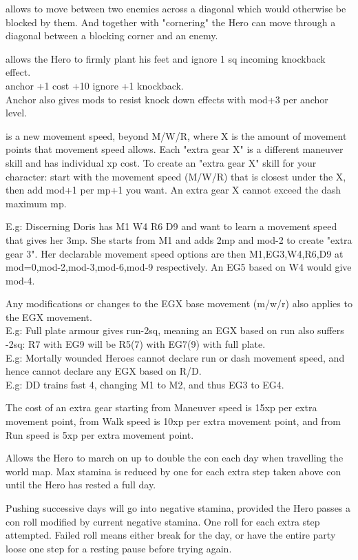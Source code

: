  allows to move between two enemies across a diagonal which would otherwise be blocked by them. And together with "cornering" the Hero can move through a diagonal between a blocking corner and an enemy.


 allows the Hero to firmly plant his feet and ignore 1 sq incoming knockback effect.\\
anchor +1 cost +10 ignore +1 knockback.\\
Anchor also gives mods to resist knock down effects with mod+3 per anchor level.


 is a new movement speed, beyond M/W/R, where X is the amount of movement points that movement speed allows. Each "extra gear X" is a different maneuver skill and has individual xp cost. To create an "extra gear X" skill for your character: start with the movement speed (M/W/R) that is closest under the X, then add mod+1 per mp+1 you want. An extra gear X cannot exceed the dash maximum mp.

E.g: Discerning Doris has M1 W4 R6 D9 and want to learn a movement speed that gives her 3mp. She starts from M1 and adds 2mp and mod-2 to create "extra gear 3". Her declarable movement speed options are then M1,EG3,W4,R6,D9 at mod=0,mod-2,mod-3,mod-6,mod-9 respectively. An EG5 based on W4 would give mod-4.

Any modifications or changes to the EGX base movement (m/w/r) also applies to the EGX movement. \\
E.g: Full plate armour gives run-2sq, meaning an EGX based on run also suffers -2sq: R7 with EG9 will be R5(7) with EG7(9) with full plate. \\
E.g: Mortally wounded Heroes cannot declare run or dash movement speed, and hence cannot declare any EGX based on R/D.\\
E.g: DD trains fast 4, changing M1 to M2, and thus EG3 to EG4.

The cost of an extra gear starting from Maneuver speed is 15xp per extra movement point, from Walk speed is 10xp per extra movement point, and from Run speed is 5xp per extra movement point.


Allows the Hero to march on up to double the con each day when travelling the world map. Max stamina is reduced by one for each extra step taken above con until the Hero has rested a full day.

Pushing successive days will go into negative stamina, provided the Hero passes a con roll modified by current negative stamina. One roll for each extra step attempted. Failed roll means either break for the day, or have the entire party loose one step for a resting pause before trying again.


